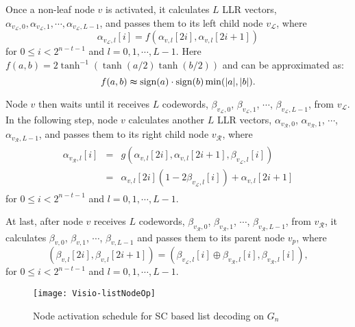 \documentclass[journal]{IEEEtran}
\begin{document}
Once a non-leaf node $v$ is activated, it calculates $L$ LLR vectors, $\alpha_{v_\mathcal{L},0}, \alpha_{v_\mathcal{L},1}, \cdots, \alpha_{v_\mathcal{L},L-1}$, and passes them to its left child node $v_\mathcal{L}$, where
\begin{equation}\label{equ: f_comp}
\alpha_{v_\mathcal{L},l}[i] = f(\alpha_{v,l}[2i],\alpha_{v,l}[2i+1])
\end{equation}
for $0\leq i <2^{n-t-1}$ and $l=0,1,\cdots,L-1$. Here $f(a,b) = 2\tanh^{-1}(\tanh(a/2)\tanh(b/2))$ and can be approximated as:
\begin{equation}\label{equ: f_comp_simplified}
f(a,b)\thickapprox \mbox{sign}(a)\cdot \mbox{sign}(b)\min(|a|,|b|).
\end{equation}

Node $v$ then waits until it receives $L$ codewords, $\beta_{v_\mathcal{L},0}$, $\beta_{v_\mathcal{L},1}$, $\cdots$, $\beta_{v_\mathcal{L},L-1}$, from $v_\mathcal{L}$. In the following step, node $v$ calculates another $L$ LLR vectors, $\alpha_{v_\mathcal{R},0}$, $\alpha_{v_\mathcal{R},1}$, $\cdots$, $\alpha_{v_\mathcal{R},L-1}$, and passes them to its right child node $v_\mathcal{R}$, where
\begin{eqnarray}\label{equ: g_comp}
 \begin{array}{lll}
 \alpha_{v_\mathcal{R},l}[i] &=& g(\alpha_{v,l}[2i], \alpha_{v,l}[2i+1], \beta_{v_\mathcal{L},l}[i])\\
  & = & \alpha_{v,l}[2i](1-2\beta_{v_\mathcal{L},l}[i])+\alpha_{v,l}[2i+1]
 \end{array}
\end{eqnarray}
for $0\leq i <2^{n-t-1}$ and $l=0,1,\cdots,L-1$.

At last, after node $v$ receives $L$ codewords, $\beta_{v_\mathcal{R},0}$, $\beta_{v_\mathcal{R},1}$, $\cdots$, $\beta_{v_\mathcal{R},L-1}$, from $v_\mathcal{R}$, it calculates $\beta_{v,0}$, $\beta_{v,1}$, $\cdots$, $\beta_{v,L-1}$ and passes them to its parent node $v_p$, where
\begin{equation}\label{equ: partial_sum}
(\beta_{v,l}[2i], \beta_{v,l}[2i+1]) = (\beta_{v_\mathcal{L}, l}[i]\oplus\beta_{v_\mathcal{R}, l}[i], \beta_{v_\mathcal{R}, l}[i]),
\end{equation}
for $0\leq i <2^{n-t-1}$ and $l=0,1,\cdots,L-1$.

\begin{figure} [hbt]
\centering
\texttt{[image: Visio-listNodeOp]}
  \caption{Node activation schedule for SC based list decoding on $G_n$}\label{fig: list_node_op}
\end{figure}
\end{document}
